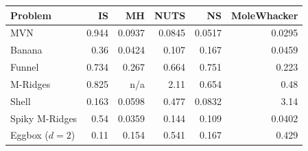 \begin{tabular}{lrrrrr}
\toprule
Problem & IS & MH & NUTS & NS & MoleWhacker \\
\midrule
MVN & 0.944 & 0.0937 & 0.0845 & 0.0517 & 0.0295 \\
Banana & 0.36 & 0.0424 & 0.107 & 0.167 & 0.0459 \\
Funnel & 0.734 & 0.267 & 0.664 & 0.751 & 0.223 \\
M-Ridges & 0.825 & n/a & 2.11 & 0.654 & 0.48 \\
Shell & 0.163 & 0.0598 & 0.477 & 0.0832 & 3.14 \\
Spiky M-Ridges & 0.54 & 0.0359 & 0.144 & 0.109 & 0.0402 \\
\midrule
Eggbox ($d=2$) & 0.11 & 0.154 & 0.541 & 0.167 & 0.429 \\
\bottomrule
\end{tabular}
